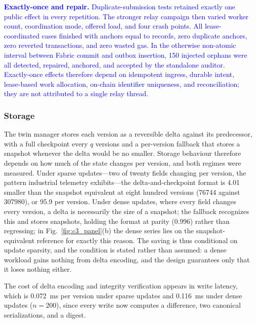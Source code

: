 \documentclass[final,5p,times,twocolumn]{elsarticle}
\begin{document}
\textcolor{blue}{\textbf{Exactly-once and repair.} Duplicate-submission tests retained exactly one public effect in every repetition. The stronger relay campaign then varied worker count, coordination mode, offered load, and four crash points. All lease-coordinated cases finished with anchors equal to records, zero duplicate anchors, zero reverted transactions, and zero wasted gas. In the otherwise non-atomic interval between Fabric commit and outbox insertion, 150 injected orphans were all detected, repaired, anchored, and accepted by the standalone auditor. Exactly-once effects therefore depend on idempotent ingress, durable intent, lease-based work allocation, on-chain identifier uniqueness, and reconciliation; they are not attributed to a single relay thread.}

\iffalse

\subsubsection*{\textbf{Storage}}
The twin manager stores each version as a reversible delta against its
predecessor, with a full checkpoint every $q$ versions and a per-version
fallback that stores a snapshot whenever the delta would be no smaller. Storage
behaviour therefore depends on how much of the state changes per version, and
both regimes were measured. Under sparse updates---two of twenty fields changing
per version, the pattern industrial telemetry exhibits---the delta-and-checkpoint
format is \SI{4.01}{\times} smaller than the snapshot equivalent at eight
hundred versions (\SI{76744}{\byte} against \SI{307980}{\byte}), or
\SI{95.9}{\byte} per version. Under dense updates, where every field changes
every version, a delta is necessarily the size of a snapshot; the fallback
recognizes this and stores snapshots, holding the format at parity
(\SI{0.996}{\times}) rather than regressing; in Fig.~\ref{fig:c3_panel}(b) the
dense series lies on the snapshot-equivalent reference for exactly this reason.
The saving is thus conditional on
update sparsity, and the condition is stated rather than assumed: a dense
workload gains nothing from delta encoding, and the design guarantees only that
it loses nothing either.

The cost of delta encoding and integrity verification appears in write latency,
which is \SI{0.072}{\milli\second} per version under sparse updates and
\SI{0.116}{\milli\second} under dense updates ($n=200$), since every write now
computes a difference, two canonical serializations, and a digest.
\end{document}
